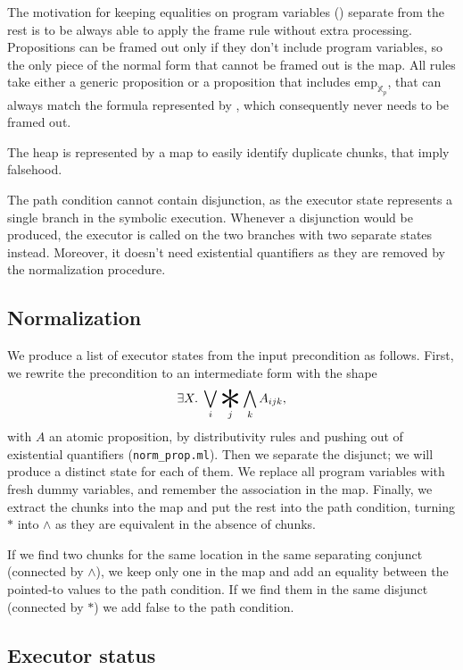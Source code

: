 \documentclass[parskip=half]{scrartcl}
\begin{document}
The motivation for keeping equalities on program variables () separate from the rest is to be always able to apply the frame rule without extra processing. Propositions can be framed out only if they don't include program variables, so the only piece of the normal form that cannot be framed out is the  map. All rules take either a generic proposition or a proposition that includes \(\mathrm{emp}_{\mathbb X_{p}}\), that can always match the formula represented by , which consequently never needs to be framed out.

The heap is represented by a map to easily identify duplicate chunks, that imply falsehood.

The path condition cannot contain disjunction, as the executor state represents a single branch in the symbolic execution. Whenever a disjunction would be produced, the executor is called on the two branches with two separate states instead. Moreover, it doesn't need existential quantifiers as they are removed by the normalization procedure.

\subsection{Normalization}

We produce a list of executor states from the input precondition as follows.
First, we rewrite the precondition to an intermediate form with the shape
\[\exists X.\;\bigvee_{i}\bigast_{j}\bigwedge_{k} A_{ijk},\]
with \(A\) an atomic proposition, by distributivity rules and pushing out of existential quantifiers (\texttt{norm\_prop.ml}). Then we separate the disjunct; we will produce a distinct state for each of them. We replace all program variables with fresh dummy variables, and remember the association in the  map. Finally, we extract the chunks into the  map and put the rest into the path condition, turning \(\ast\) into \(\wedge\) as they are equivalent in the absence of chunks.

If we find two chunks for the same location in the same separating conjunct (\ie connected by \(\wedge\)), we keep only one in the  map and add an equality between the pointed-to values to the path condition. If we find them in the same disjunct (connected by \(\ast\)) we add false to the path condition.

\subsection{Executor status}
\end{document}
